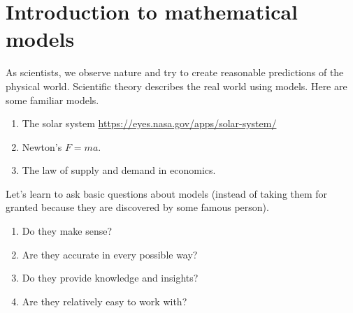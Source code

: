 \documentclass[../main.tex]{subfiles}
\begin{document}
 \section{Introduction to mathematical models}
As scientists, we observe nature and try to create reasonable predictions of the physical world. Scientific theory describes the real world using models. Here are some familiar models.

\begin{enumerate}
  \item The solar system \url{https://eyes.nasa.gov/apps/solar-system/}
  \item Newton's \(F = ma\).
  \item The law of supply and demand in economics.
\end{enumerate}

Let's learn to ask basic questions about models (instead of taking them for granted because they are discovered by some famous person).
\begin{enumerate}[wide]
  \item Do they make sense? 


  \item Are they accurate in every possible way? 


  \item Do they provide knowledge and insights? 


  \item Are they relatively easy to work with? 

\end{enumerate}
\end{document}
